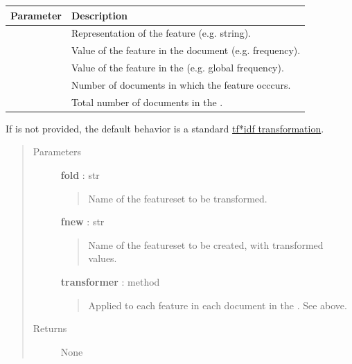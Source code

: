 \documentclass[letterpaper,10pt,english]{sphinxmanual}
\begin{document}
\begin{fulllineitems}
\begin{fulllineitems}
\begin{tabulary}{\linewidth}{|L|L|}
\hline
\textsf{\relax 
Parameter
} & \textsf{\relax 
Description
}\\
\hline
{}
 & 
Representation of the feature (e.g. string).
\\

 & 
Value of the feature in the document (e.g. frequency).
\\

 & 
Value of the feature in the {\hyperref[tethne.classes.corpus:tethne.classes.corpus.Corpus]{}} (e.g. global
frequency).
\\

 & 
Number of documents in which the feature occcurs.
\\

 & 
Total number of documents in the {\hyperref[tethne.classes.corpus:tethne.classes.corpus.Corpus]{}}.
\\
\hline\end{tabulary}


If  is not provided, the default behavior is a standard
\href{http://en.wikipedia.org/wiki/Tf\%E2\%80\%93idf}{tf*idf transformation}.
\begin{quote}\begin{description}
\item[{Parameters}] \leavevmode
\textbf{fold} : str
\begin{quote}

Name of the featureset to be transformed.
\end{quote}

\textbf{fnew} : str
\begin{quote}

Name of the featureset to be created, with transformed values.
\end{quote}

\textbf{transformer} : method
\begin{quote}

Applied to each feature in each document in the {\hyperref[tethne.classes.corpus:tethne.classes.corpus.Corpus]{}}.
See above.
\end{quote}

\item[{Returns}] \leavevmode
None

\end{description}\end{quote}

\end{fulllineitems}


\end{fulllineitems}
\end{document}
